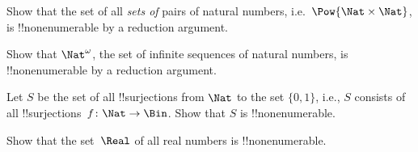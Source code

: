 \documentclass[../../../include/open-logic-section]{subfiles}
\begin{document}
\begin{prob}
Show that the set of all \emph{sets of} pairs of natural numbers, i.e.\ $\Pow{\Nat \times \Nat}$, is
!!{nonenumerable} by a reduction argument.
\end{prob}

\begin{prob}
Show that $\Nat^\omega$, the set of infinite sequences of
natural numbers, is !!{nonenumerable} by a reduction argument.
\end{prob}


\begin{prob}
Let $S$ be the set of all !!{surjection}s from $\Nat$ to the set $\{0,1\}$, i.e., $S$ consists of all
!!{surjection}s~$f \colon \Nat \to \Bin$.  Show that $S$ is
!!{nonenumerable}.
\end{prob}

\begin{prob}
Show that the set~$\Real$ of all real numbers is !!{nonenumerable}.
\end{prob}
\end{document}
